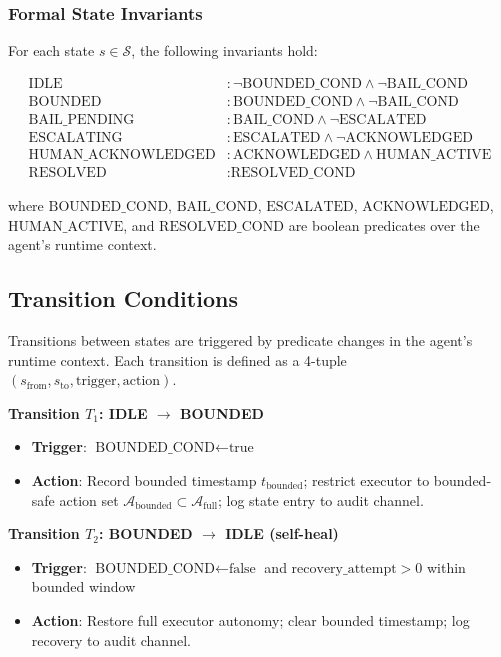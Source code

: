\subsubsection{Formal State Invariants}

For each state $s \in \mathcal{S}$, the following invariants hold:

\begin{align}
  \text{IDLE} &: \neg \text{BOUNDED\_COND} \land \neg \text{BAIL\_COND} \\
  \text{BOUNDED} &: \text{BOUNDED\_COND} \land \neg \text{BAIL\_COND} \\
  \text{BAIL\_PENDING} &: \text{BAIL\_COND} \land \neg \text{ESCALATED} \\
  \text{ESCALATING} &: \text{ESCALATED} \land \neg \text{ACKNOWLEDGED} \\
  \text{HUMAN\_ACKNOWLEDGED} &: \text{ACKNOWLEDGED} \land \text{HUMAN\_ACTIVE} \\
  \text{RESOLVED} &: \text{RESOLVED\_COND}
\end{align}

where $\text{BOUNDED\_COND}$, $\text{BAIL\_COND}$, $\text{ESCALATED}$, $\text{ACKNOWLEDGED}$, $\text{HUMAN\_ACTIVE}$, and $\text{RESOLVED\_COND}$ are boolean predicates over the agent's runtime context.

\subsection{Transition Conditions}

Transitions between states are triggered by predicate changes in the agent's runtime context. Each transition is defined as a 4-tuple $(s_{\text{from}}, s_{\text{to}}, \text{trigger}, \text{action})$.

\medskip\noindent\textbf{Transition $T_1$: IDLE $\rightarrow$ BOUNDED}
\begin{itemize}
  \item \textbf{Trigger}: $\text{BOUNDED\_COND} \gets \text{true}$
  \item \textbf{Action}: Record bounded timestamp $t_{\text{bounded}}$; restrict executor to bounded-safe action set $\mathcal{A}_{\text{bounded}} \subset \mathcal{A}_{\text{full}}$; log state entry to audit channel.
\end{itemize}

\medskip\noindent\textbf{Transition $T_2$: BOUNDED $\rightarrow$ IDLE (self-heal)}
\begin{itemize}
  \item \textbf{Trigger}: $\text{BOUNDED\_COND} \gets \text{false}$ and $\text{recovery\_attempt} > 0$ within bounded window
  \item \textbf{Action}: Restore full executor autonomy; clear bounded timestamp; log recovery to audit channel.
\end{itemize}

